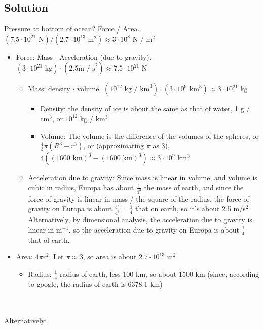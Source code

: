 \documentclass[solutions]{esg8012pset}
\begin{document}
\subsection*{Solution}
  Pressure at bottom of ocean?  Force / Area.  $(7.5\cdot 10^{21}\text{ N}) / (2.7 \cdot 10^{13}\text{ m}^2) \approx 3 \cdot 10^8$ N / m$^2$
  \begin{itemize}
    \item Force: Mass $\cdot$ Acceleration (due to gravity). $(3 \cdot 10^{21}\text{ kg}) \cdot (2.5\text{m / s}^2) \approx 7.5\cdot 10^{21}$ N
      \begin{itemize}
        \item Mass: density $\cdot$ volume.  $(10^{12}\text{ kg / km}^3) \cdot (3 \cdot 10^9\text{ km}^3) \approx 3 \cdot 10^{21}$ kg
          \begin{itemize}
            \item Density: the density of ice is about the same as that of water, 1 g / cm$^3$, or $10^{12}$ kg / km$^3$
            \item Volume: The volume is the difference of the volumes of the spheres, or $\frac{4}{3}\pi (R^3 - r^3)$, or (approximating $\pi$ as 3), $4((1600\text{ km})^3 - (1600\text{ km})^3) \approx 3 \cdot 10^9$ km$^3$
          \end{itemize}
        \item Acceleration due to gravity: Since mass is linear in volume, and volume is cubic in radius, Europa has about $\frac{1}{4^3}$ the mass of earth, and since the force of gravity is linear in mass / the square of the radius, the force of gravity on Europa is about $\frac{4^2}{4^3} = \frac{1}{4}$ that on earth, so it's about 2.5 m/s$^2$  Alternatively, by dimensional analysis, the acceleration due to gravity is linear in m$^{-1}$, so the acceleration due to gravity on Europa is about $\frac{1}{4}$ that of earth.
      \end{itemize}
    \item Area: $4\pi r^2$.  Let $\pi \approx 3$, so area is about $2.7 \cdot 10^{13}$ m$^2$
      \begin{itemize}
        \item Radius: $\frac{1}{4}$ radius of earth, less 100 km, so about 1500 km (since, according to google, the radius of earth is 6378.1 km)
      \end{itemize}
  \end{itemize}
  \\ \\
  \noindent Alternatively: \par
\end{document}
